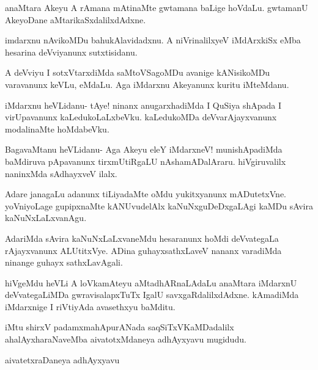 \documentclass{article}
\begin{document}
\begin{mng}%
anaMtara Akeyu A rAmana mAtinaMte gwtamana baLige
hoVdaLu. gwtamanU AkeyoDane aMtarikaSxdalilxdAdxne.
\end{mng}

\begin{mng}%
imdarxnu nAvikoMDu bahukAlavidadxnu. A niVrinalilxyeV
iMdArxkiSx eMba hesarina deVviyanunx sutxtisidanu.
\end{mng}

\begin{mng}%
A deVviyu I sotxVtarxdiMda saMtoVSagoMDu avanige
kANisikoMDu varavanunx keVLu, eMdaLu. Aga iMdarxnu Akeyanunx
kuritu iMteMdanu.
\end{mng}

\begin{mng}%
iMdarxnu heVLidanu- tAye! ninanx anugarxhadiMda I QuSiya
shApada I virUpavanunx kaLedukoLaLxbeVku. kaLedukoMDa deVvarAjayxvanunx
modalinaMte hoMdabeVku.
\end{mng}

\begin{mng}%
BagavaMtanu heVLidanu- Aga Akeyu eleY iMdarxneV! munishApadiMda
baMdiruva pApavanunx tirxmUtiRgaLU nAshamADalAraru. hiVgiruvalilx
naninxMda sAdhayxveV ilalx.
\end{mng}

\begin{mng}%
Adare janagaLu adanunx tiLiyadaMte oMdu yukitxyanunx
mADutetxVne. yoVniyoLage gupipxnaMte kANUvudelAlx kaNuNxguDeDxgaLAgi
kaMDu sAvira kaNuNxLaLxvanAgu.
\end{mng}

\begin{mng}%
AdariMda sAvira kaNuNxLaLxvaneMdu hesaranunx hoMdi deVvategaLa
rAjayxvanunx ALUtitxVye. ADina guhayxsathxLaveV nananx varadiMda ninange guhayx sathxLavAgali.
\end{mng}

\begin{mng}%
hiVgeMdu heVLi A loVkamAteyu aMtadhARnaLAdaLu
anaMtara iMdarxnU deVvategaLiMDa gwravisalapxTuTx IgalU savxgaRdalilxdAdxne.
kAmadiMda iMdarxnige I riVtiyAda avasethxyu baMditu.
\end{mng}

\begin{center}
iMtu shirxV padamxmahApurANada saqSiTxVKaMDadalilx ahalAyxharaNaveMba
aivatotxMdaneya adhAyxyavu mugidudu.
\end{center}

\newpage
\begin{center}
{\textbf\large{aivatetxraDaneya adhAyxyavu}}
\end{center}
\end{document}
